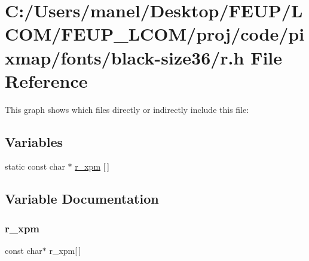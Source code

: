 \hypertarget{black-size36_2r_8h}{}\section{C\+:/\+Users/manel/\+Desktop/\+F\+E\+U\+P/\+L\+C\+O\+M/\+F\+E\+U\+P\+\_\+\+L\+C\+O\+M/proj/code/pixmap/fonts/black-\/size36/r.h File Reference}
\label{black-size36_2r_8h}
This graph shows which files directly or indirectly include this file\+:
\subsection*{Variables}
\begin{DoxyCompactItemize}
\item 
static const char $\ast$ \mbox{\hyperlink{black-size36_2r_8h_ae2f54a291517896ccf43a0957da928fa}{r\+\_\+xpm}} \mbox{[}$\,$\mbox{]}
\end{DoxyCompactItemize}


\subsection{Variable Documentation}
\mbox{\label{black-size36_2r_8h_ae2f54a291517896ccf43a0957da928fa}} 
\subsubsection{\texorpdfstring{r\_xpm}{r\_xpm}}
{\footnotesize\ttfamily const char$\ast$ r\+\_\+xpm\mbox{[}$\,$\mbox{]}\hspace{0.3cm}{\ttfamily [static]}}

